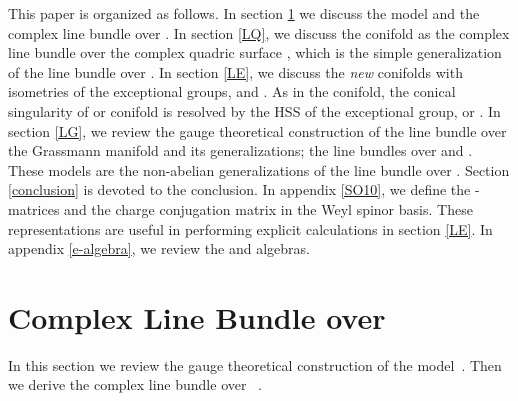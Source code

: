 \documentclass[a4paper,11pt]{article}
\begin{document}
{This paper is organized as follows.
In section \ref{Calabi-section}
we discuss the \coordHE{} model and 
the complex line bundle over \coordHE{}. 
In section \ref{LQ},
we discuss the conifold as 
the complex line bundle 
over the complex quadric surface \coordHE{}, 
which is the simple generalization of 
the line bundle over \coordHE{}.
In section \ref{LE},
we discuss the {\it new} conifolds 
with isometries of the exceptional groups, 
\coordHE{} and \coordHE{}.
As in the conifold, the conical singularity of 
\coordHE{} or \coordHE{} conifold 
is resolved by the HSS of the exceptional group, 
\coordHE{} or \coordHE{}. 
In section \ref{LG},
we review the gauge theoretical construction of 
the line bundle over the Grassmann manifold \coordHE{} 
and its generalizations;
the line bundles over \coordHE{} and \coordHE{}.
These models are 
the non-abelian generalizations of 
the line bundle over \coordHE{}. 
Section \ref{conclusion} is devoted to the conclusion.
In appendix \ref{SO10},
we define the \coordHE{}  \myHighlight{$\gamma$}\coordHE{}-matrices 
and the charge conjugation matrix 
in the Weyl spinor basis.
These representations are useful in performing explicit calculations 
in section \ref{LE}.
In appendix \ref{e-algebra},
we review the \coordHE{} and \coordHE{} algebras.


\section{Complex Line Bundle over \coordHE{}}
\label{Calabi-section}

In this section
we review the gauge theoretical construction 
of the \coordHE{} model~\cite{DDL}.
Then we derive 
the complex line bundle over \coordHE{}~\cite{Ca}.

}
\end{document}
